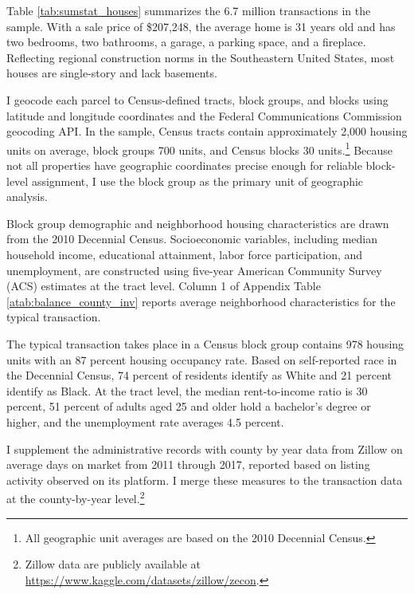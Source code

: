 \documentclass[11pt]{article}
\begin{document}
Table \ref{tab:sumstat_houses} summarizes the 6.7 million transactions in the sample. With a sale price of \$207,248, the average home is 31 years old and has two bedrooms, two bathrooms, a garage, a parking space, and a fireplace. Reflecting regional construction norms in the Southeastern United States, most houses are single-story and lack basements. 

I geocode each parcel to Census-defined tracts, block groups, and blocks using latitude and longitude coordinates and the Federal Communications Commission geocoding API. In the sample, Census tracts contain approximately 2,000 housing units on average, block groups 700 units, and Census blocks 30 units.\footnote{All geographic unit averages are based on the 2010 Decennial Census.} Because not all properties have geographic coordinates precise enough for reliable block-level assignment, I use the block group as the primary unit of geographic analysis.

Block group demographic and neighborhood housing characteristics are drawn from the 2010 Decennial Census. Socioeconomic variables, including median household income, educational attainment, labor force participation, and unemployment, are constructed using five-year American Community Survey (ACS) estimates at the tract level. Column 1 of Appendix Table \ref{atab:balance_county_inv} reports average neighborhood characteristics for the typical transaction.

The typical transaction takes place in a Census block group contains 978 housing units with an 87 percent housing occupancy rate. Based on self-reported race in the Decennial Census, 74 percent of residents identify as White and 21 percent identify as Black. At the tract level, the median rent-to-income ratio is 30 percent, 51 percent of adults aged 25 and older hold a bachelor’s degree or higher, and the unemployment rate averages 4.5 percent.

I supplement the administrative records with county by year data from Zillow on average days on market from 2011 through 2017, reported based on listing activity observed on its platform. I merge these measures to the transaction data at the county-by-year level.\footnote{Zillow data are publicly available at \url{https://www.kaggle.com/datasets/zillow/zecon}.}
\end{document}
